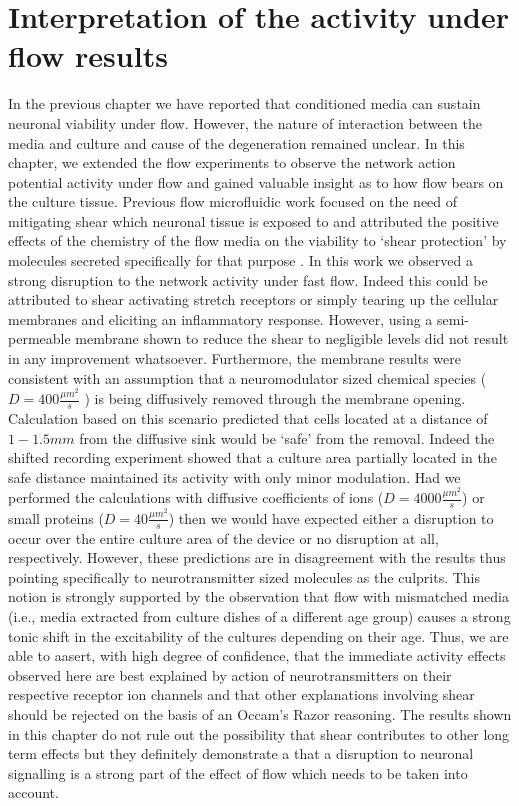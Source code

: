 \section{Interpretation of the activity under flow results}
\label{sec:crossFlow:interp}
In the previous chapter we have reported that conditioned media can sustain neuronal viability under flow. However, the nature of interaction between the media and culture and cause of the degeneration remained unclear. In this chapter, we extended the flow experiments to observe the network action potential activity under flow and gained valuable insight as to how flow bears on the culture tissue. Previous flow microfluidic work focused on the need of mitigating shear \cite{morel2012amplification,wang2008microfluidics} which neuronal tissue is exposed to and attributed the positive effects of the chemistry of the flow media on the viability to `shear protection' by molecules secreted specifically for that purpose \cite{liu2013galanin}. In this work we observed a strong disruption to the network activity under fast flow. Indeed this could be attributed to shear activating stretch receptors or simply tearing up the cellular membranes and eliciting an inflammatory response. However, using a semi-permeable membrane shown to reduce the shear to negligible levels \cite{morel2012concentration} did not result in any improvement whatsoever. Furthermore, the membrane results were consistent with an assumption that a neuromodulator sized chemical species (\(D=400\frac{\mu m^{2}}{s}\) \cite{johnstoneThesis}) is being diffusively removed through the membrane opening. Calculation based on this scenario predicted that cells located at a distance of \(1-1.5 mm\) from the diffusive sink would be `safe' from the removal. Indeed the shifted recording experiment showed that a culture area partially located in the safe distance maintained its activity with only minor modulation. Had we performed the calculations with diffusive coefficients of ions (\(D=4000\frac{\mu m^{2}}{s}\)) or small proteins  (\(D=40\frac{\mu m^{2}}{s}\)) then we would have expected either a disruption to occur over the entire culture area of the device or no disruption at all, respectively. However, these predictions are in disagreement with the results thus pointing specifically to neurotransmitter sized molecules as the culprits. This notion is strongly supported by the observation that flow with mismatched media (i.e., media extracted from culture dishes of a different age group) causes a strong tonic shift in the excitability of the cultures depending on their age. Thus, we are able to aasert, with high degree of confidence, that the immediate activity effects observed here are best explained by action of neurotransmitters on their respective receptor ion channels and that other explanations involving shear should be rejected on the basis of an Occam's Razor reasoning. The results shown in this chapter do not rule out the possibility that shear contributes to other long term effects but they definitely demonstrate a that a disruption to neuronal signalling is a strong part of the effect of flow which  needs to be taken into account.

